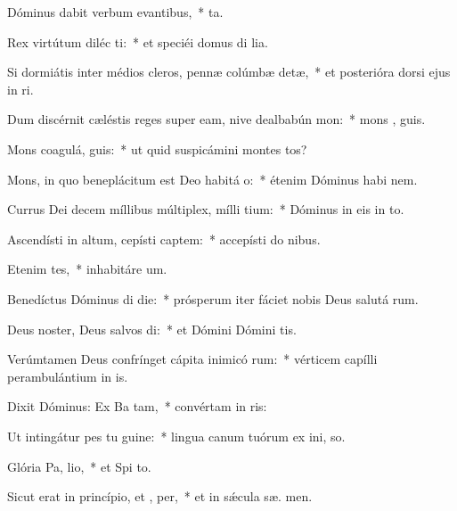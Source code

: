 \item Dóminus dabit verbum evantibus,~*  ta.
\item Rex virtútum diléc ti:~* et speciéi domus di lia.
\item Si dormiátis inter médios cleros, pennæ colúmbæ detæ,~* et posterióra dorsi ejus in  ri.
\item Dum discérnit cæléstis reges super eam, nive dealbabún  mon:~* mons ,  guis.
\item Mons coagulá,  guis:~* ut quid suspicámini montes tos?
\item Mons, in quo beneplácitum est Deo habitá  o:~* étenim Dóminus habi  nem.
\item Currus Dei decem míllibus múltiplex, mílli tium:~* Dóminus in eis in   to.
\item Ascendísti in altum, cepísti captem:~* accepísti do  nibus.
\item Etenim  tes,~* inhabitáre  um.
\item Benedíctus Dóminus di die:~* prósperum iter fáciet nobis Deus salutá rum.
\item Deus noster, Deus salvos di:~* et Dómini Dómini  tis.
\item Verúmtamen Deus confrínget cápita inimicó rum:~* vérticem capílli perambulántium in  is.
\item Dixit Dóminus: Ex Ba tam,~* convértam in  ris:
\item Ut intingátur pes tu  guine:~* lingua canum tuórum ex ini,  so.
\item Glória Pa,  lio,~* et Spi to.
\item Sicut erat in princípio, et ,  per,~* et in sǽcula sæ. men.
